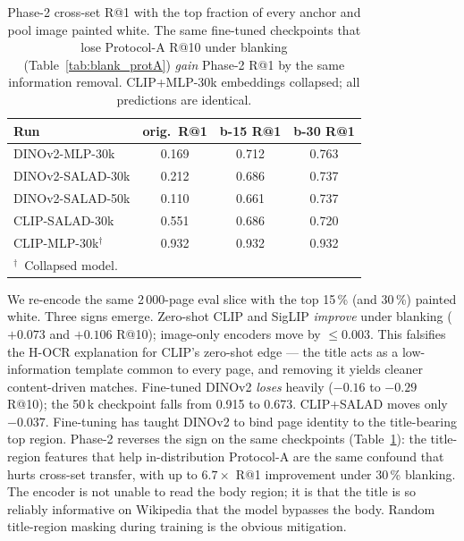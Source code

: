 \documentclass{article}
\begin{document}
\begin{table}[t]
\caption{Phase-2 cross-set R@1 with the top fraction of every
anchor and pool image painted white. The same fine-tuned
checkpoints that lose Protocol-A R@10 under blanking
(Table~\ref{tab:blank_protA}) \emph{gain} Phase-2 R@1 by the same
information removal. CLIP+MLP-30k embeddings collapsed; all
predictions are identical.}
\label{tab:blank_phase2}
\centering
\small
\begin{tabular}{lccc}
\toprule
Run & orig.\ R@1 & b-15 R@1 & b-30 R@1 \\
\midrule
\rowcolor{cFT} DINOv2-MLP-30k     & 0.169 & 0.712 & 0.763 \\
\rowcolor{cFT} DINOv2-SALAD-30k   & 0.212 & 0.686 & 0.737 \\
\rowcolor{cFT} DINOv2-SALAD-50k   & 0.110 & 0.661 & 0.737 \\
\rowcolor{cFT} CLIP-SALAD-30k     & 0.551 & 0.686 & 0.720 \\
\rowcolor{cFT} CLIP-MLP-30k$^\dagger$ & 0.932 & 0.932 & 0.932 \\
\bottomrule
\multicolumn{4}{l}{\footnotesize $^\dagger$~Collapsed model.}
\end{tabular}
\end{table}

We re-encode the same 2\,000-page eval slice with the top 15\,\%
(and 30\,\%) painted white. Three signs emerge.
Zero-shot CLIP and SigLIP \emph{improve} under blanking ($+0.073$
and $+0.106$ R@10); image-only encoders move by $\le 0.003$. This
falsifies the H-OCR explanation for CLIP's zero-shot edge --- the
title acts as a low-information template common to every page, and
removing it yields cleaner content-driven matches.
Fine-tuned DINOv2 \emph{loses} heavily ($-0.16$ to $-0.29$ R@10);
the 50\,k checkpoint falls from 0.915 to 0.673. CLIP+SALAD moves
only $-0.037$. Fine-tuning has taught DINOv2 to bind page identity
to the title-bearing top region.
Phase-2 reverses the sign on the same checkpoints
(Table~\ref{tab:blank_phase2}): the title-region features that
help in-distribution Protocol-A are the same confound that hurts
cross-set transfer, with up to $6.7\times$ R@1 improvement under
30\,\% blanking. The encoder is not unable to read the body region;
it is that the title is so reliably informative on Wikipedia that
the model bypasses the body. Random title-region masking during
training is the obvious mitigation.
\end{document}
